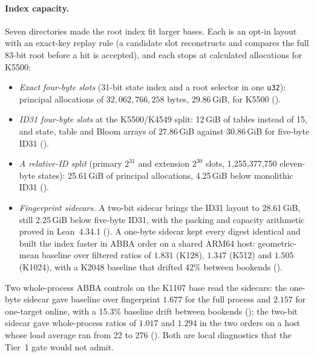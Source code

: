 \paragraph{Index capacity.} Seven directories made the root index fit
larger bases. Each is an opt-in layout with an exact-key replay rule (a
candidate slot reconstructs and compares the full 83-bit root before a hit
is accepted), and each stops at calculated allocations for K5500:
\begin{itemize}
\item \emph{Exact four-byte slots} (31-bit state index and a root selector
  in one \texttt{u32}): principal allocations of $32{,}062{,}766{,}258$
  bytes, 29.86\,GiB, for K5500
  ().
\item \emph{ID31 four-byte slots} at the K5500/K4549 split: 12\,GiB of
  tables instead of 15, and state, table and Bloom arrays of 27.86\,GiB
  against 30.86\,GiB for five-byte ID31
  ().
\item \emph{A relative-ID split} (primary $2^{31}$ and extension $2^{30}$
  slots, 1{,}255{,}377{,}750 eleven-byte states): 25.61\,GiB of principal
  allocations, 4.25\,GiB below monolithic ID31
  ().
\item \emph{Fingerprint sidecars.} A two-bit sidecar brings the ID31 layout
  to 28.61\,GiB, still 2.25\,GiB below five-byte ID31, with the packing and
  capacity arithmetic proved in Lean~4.34.1
  (). A one-byte sidecar
  kept every digest identical and built the index faster in ABBA order on a
  shared ARM64 host: geometric-mean baseline over filtered ratios of
  $1.831$ (K128), $1.347$ (K512) and $1.505$ (K1024), with a K2048 baseline
  that drifted 42\% between bookends
  ().
\end{itemize}
Two whole-process ABBA controls on the K1107 base read the sidecars:
the one-byte sidecar gave baseline over fingerprint $1.677$ for the full
process and $2.157$ for one-target online, with a 15.3\% baseline drift
between bookends ();
the two-bit sidecar gave whole-process ratios of $1.017$ and $1.294$ in the
two orders on a host whose load average ran from 22 to 276
(). Both are local
diagnostics that the Tier~1 gate would not admit.

